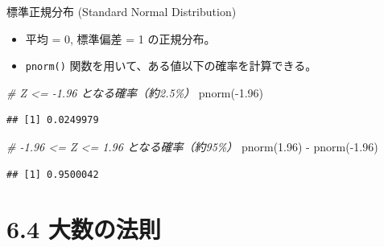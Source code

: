 \documentclass[
  ignorenonframetext,
]{beamer}
\newenvironment{Shaded}{\begin{snugshade}}{\end{snugshade}}
\newcommand{\CommentTok}[1]{\textcolor[rgb]{0.56,0.35,0.01}{\textit{#1}}}
\newcommand{\FloatTok}[1]{\textcolor[rgb]{0.00,0.00,0.81}{#1}}
\newcommand{\FunctionTok}[1]{\textcolor[rgb]{0.00,0.00,0.00}{#1}}
\newcommand{\NormalTok}[1]{#1}
\newcommand{\SpecialCharTok}[1]{\textcolor[rgb]{0.00,0.00,0.00}{#1}}
\providecommand{\tightlist}{%
  \setlength{\itemsep}{0pt}\setlength{\parskip}{0pt}}
\begin{document}
\begin{frame}[fragile]{標準正規分布 (Standard Normal Distribution)}
\protect\hypertarget{ux6a19ux6e96ux6b63ux898fux5206ux5e03-standard-normal-distribution}{}
\begin{itemize}
\tightlist
\item
  平均 = 0, 標準偏差 = 1 の正規分布。
\item
  \texttt{pnorm()} 関数を用いて、ある値以下の確率を計算できる。
\end{itemize}

\begin{Shaded}
\begin{Highlighting}[]
\CommentTok{\# Z \textless{}= {-}1.96 となる確率（約2.5\%）}
\FunctionTok{pnorm}\NormalTok{(}\SpecialCharTok{{-}}\FloatTok{1.96}\NormalTok{)}
\end{Highlighting}
\end{Shaded}

\begin{verbatim}
## [1] 0.0249979
\end{verbatim}

\begin{Shaded}
\begin{Highlighting}[]
\CommentTok{\# {-}1.96 \textless{}= Z \textless{}= 1.96 となる確率（約95\%）}
\FunctionTok{pnorm}\NormalTok{(}\FloatTok{1.96}\NormalTok{) }\SpecialCharTok{{-}} \FunctionTok{pnorm}\NormalTok{(}\SpecialCharTok{{-}}\FloatTok{1.96}\NormalTok{)}
\end{Highlighting}
\end{Shaded}

\begin{verbatim}
## [1] 0.9500042
\end{verbatim}
\end{frame}

\hypertarget{ux5927ux6570ux306eux6cd5ux5247}{%
\section{6.4 大数の法則}\label{ux5927ux6570ux306eux6cd5ux5247}}
\end{document}
